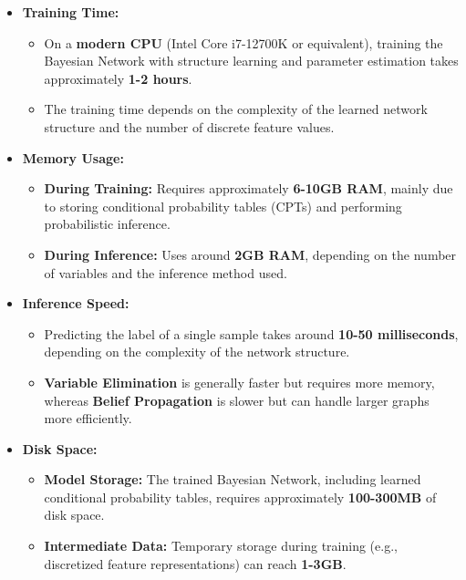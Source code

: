 \begin{itemize} \item \textbf{Training Time:}
\begin{itemize} \item On a \textbf{modern CPU} (Intel Core i7-12700K or equivalent), training the Bayesian Network with structure learning and parameter estimation takes approximately \textbf{1-2 hours}. \item The training time depends on the complexity of the learned network structure and the number of discrete feature values. \end{itemize}

\item \textbf{Memory Usage:}  
\begin{itemize}
    \item \textbf{During Training:} Requires approximately \textbf{6-10GB RAM}, mainly due to storing conditional probability tables (CPTs) and performing probabilistic inference.
    \item \textbf{During Inference:} Uses around \textbf{2GB RAM}, depending on the number of variables and the inference method used.
\end{itemize}

\item \textbf{Inference Speed:}  
\begin{itemize}
    \item Predicting the label of a single sample takes around \textbf{10-50 milliseconds}, depending on the complexity of the network structure.
    \item \textbf{Variable Elimination} is generally faster but requires more memory, whereas \textbf{Belief Propagation} is slower but can handle larger graphs more efficiently.
\end{itemize}

\item \textbf{Disk Space:}  
\begin{itemize}
    \item \textbf{Model Storage:} The trained Bayesian Network, including learned conditional probability tables, requires approximately \textbf{100-300MB} of disk space.
    \item \textbf{Intermediate Data:} Temporary storage during training (e.g., discretized feature representations) can reach \textbf{1-3GB}.
\end{itemize}

\end{itemize}



